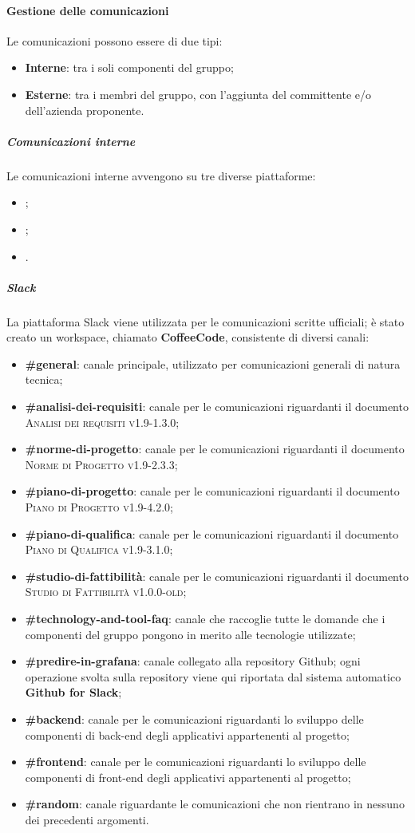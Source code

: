 \paragraph{Gestione delle comunicazioni}
Le comunicazioni possono essere di due tipi:
\begin{itemize}
  \item \textbf{Interne}: tra i soli componenti del gruppo;
  \item \textbf{Esterne}: tra i membri del gruppo, con l'aggiunta del committente e/o dell'azienda proponente.
\end{itemize}
\subparagraph{Comunicazioni interne}
Le comunicazioni interne avvengono su tre diverse piattaforme:
\begin{itemize}
  \item {};
  \item {};
  \item {}.
\end{itemize}
\subparagraph*{Slack}
La piattaforma Slack viene utilizzata per le comunicazioni scritte ufficiali; è stato creato un workspace, chiamato \textbf{CoffeeCode}, consistente di diversi canali:
\begin{itemize}
  \item \textbf{\#general}: canale principale, utilizzato per comunicazioni generali di natura tecnica;
  \item \textbf{\#analisi-dei-requisiti}: canale per le comunicazioni riguardanti il documento \textsc{Analisi dei requisiti v1.9-1.3.0};
  \item \textbf{\#norme-di-progetto}: canale per le comunicazioni riguardanti il documento \textsc{Norme di Progetto v1.9-2.3.3};
  \item \textbf{\#piano-di-progetto}: canale per le comunicazioni riguardanti il documento \textsc{Piano di Progetto v1.9-4.2.0};
  \item \textbf{\#piano-di-qualifica}: canale per le comunicazioni riguardanti il documento \textsc{Piano di Qualifica v1.9-3.1.0};
  \item \textbf{\#studio-di-fattibilità}: canale per le comunicazioni riguardanti il documento \textsc{Studio di Fattibilità v1.0.0-old};
  \item \textbf{\#technology-and-tool-faq}: canale che raccoglie tutte le domande che i componenti del gruppo pongono in merito alle tecnologie utilizzate;
  \item \textbf{\#predire-in-grafana}: canale collegato alla repository Github; ogni operazione svolta sulla repository viene qui riportata dal sistema automatico \textbf{Github for Slack};
  \item \textbf{\#backend}: canale per le comunicazioni riguardanti lo sviluppo delle componenti di back-end degli applicativi appartenenti al progetto;
  \item \textbf{\#frontend}: canale per le comunicazioni riguardanti lo sviluppo delle componenti di front-end degli applicativi appartenenti al progetto;
  \item \textbf{\#random}: canale riguardante le comunicazioni che non rientrano in nessuno dei precedenti argomenti.
\end{itemize}

